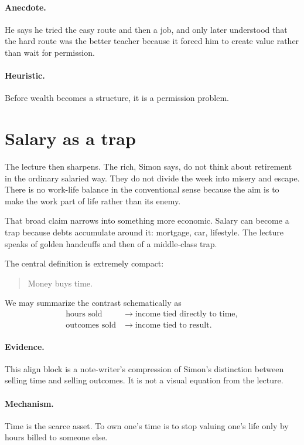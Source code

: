 \documentclass[11pt,oneside]{book}
\begin{document}
\paragraph{Anecdote.} He says he tried the easy route and then a job, and only later understood that the hard route was the better teacher because it forced him to create value rather than wait for permission.

\paragraph{Heuristic.} Before wealth becomes a structure, it is a permission problem.

\section{Salary as a trap}

The lecture then sharpens. The rich, Simon says, do not think about retirement in the ordinary salaried way. They do not divide the week into misery and escape. There is no work-life balance in the conventional sense because the aim is to make the work part of life rather than its enemy.

That broad claim narrows into something more economic. Salary can become a trap because debts accumulate around it: mortgage, car, lifestyle. The lecture speaks of golden handcuffs and then of a middle-class trap.

The central definition is extremely compact:
\begin{quote}
Money buys time.
\end{quote}

We may summarize the contrast schematically as
\begin{align}
\text{hours sold} &\longrightarrow \text{income tied directly to time},\\
\text{outcomes sold} &\longrightarrow \text{income tied to result}.
\end{align}

\paragraph{Evidence.} This align block is a note-writer's compression of Simon's distinction between selling time and selling outcomes. It is not a visual equation from the lecture.

\paragraph{Mechanism.} Time is the scarce asset. To own one's time is to stop valuing one's life only by hours billed to someone else.
\end{document}
